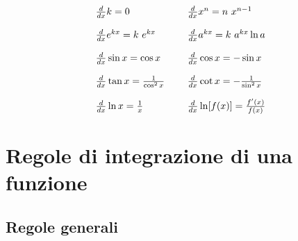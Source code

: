 \documentclass[10pt,a4paper]{book}
\begin{document}
\begin{equation*}
	\begin{array}{ l l }
		\frac{d}{dx} k=0 & \frac{d}{dx} x^n =n\ x^{n-1}\\
		[4mm]
		\frac{d}{dx} e^{kx} =k\ e^{kx} & \frac{d}{dx} a^{kx} =k\ a^{kx}\ln a\\
		[4mm]
		\frac{d}{dx}\sin x=\cos x & \frac{d}{dx}\cos x=-\sin x\\
		[4mm]
		\frac{d}{dx}\tan x=\frac{1}{\cos^2 x} \ \ \ \  & \frac{d}{dx}\cot x=-\frac{1}{\sin^2 x}\\
		[4mm]
		\frac{d}{dx}\ln x=\frac{1}{x} & \frac{d}{dx}\ln[ f( x)] =\frac{f'( x)}{f( x)}
	\end{array}
\end{equation*}







































\section{Regole di integrazione di una funzione}

\subsection*{Regole generali}
\end{document}
